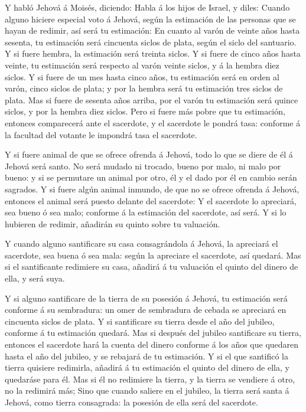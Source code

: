  Y habló Jehová á Moisés, diciendo:  Habla á los
hijos de Israel, y diles: Cuando alguno hiciere especial voto á Jehová,
según la estimación de las personas que se hayan de redimir, así será tu
estimación:  En cuanto al varón de veinte años hasta
sesenta, tu estimación será cincuenta siclos de plata, según el siclo
del santuario.  Y si fuere hembra, la estimación será
treinta siclos.  Y si fuere de cinco años hasta veinte, tu
estimación será respecto al varón veinte siclos, y á la hembra diez
siclos.  Y si fuere de un mes hasta cinco años, tu
estimación será en orden al varón, cinco siclos de plata; y por la
hembra será tu estimación tres siclos de plata.  Mas si
fuere de sesenta años arriba, por el varón tu estimación será quince
siclos, y por la hembra diez siclos.  Pero si fuere más
pobre que tu estimación, entonces comparecerá ante el sacerdote, y el
sacerdote le pondrá tasa: conforme á la facultad del votante le impondrá
tasa el sacerdote.

 Y si fuere animal de que se ofrece ofrenda á Jehová, todo
lo que se diere de él á Jehová será santo.  No será mudado
ni trocado, bueno por malo, ni malo por bueno: y si se permutare un
animal por otro, él y el dado por él en cambio serán sagrados.
 Y si fuere algún animal inmundo, de que no se ofrece
ofrenda á Jehová, entonces el animal será puesto delante del sacerdote:
 Y el sacerdote lo apreciará, sea bueno ó sea malo;
conforme á la estimación del sacerdote, así será.  Y si lo
hubieren de redimir, añadirán su quinto sobre tu valuación.

 Y cuando alguno santificare su casa consagrándola á
Jehová, la apreciará el sacerdote, sea buena ó sea mala: según la
apreciare el sacerdote, así quedará.  Mas si el
santificante redimiere su casa, añadirá á tu valuación el quinto del
dinero de ella, y será suya.

 Y si alguno santificare de la tierra de su posesión á
Jehová, tu estimación será conforme á su sembradura: un omer de
sembradura de cebada se apreciará en cincuenta siclos de plata.
 Y si santificare su tierra desde el año del jubileo,
conforme á tu estimación quedará.  Mas si después del
jubileo santificare su tierra, entonces el sacerdote hará la cuenta del
dinero conforme á los años que quedaren hasta el año del jubileo, y se
rebajará de tu estimación.  Y si el que santificó la tierra
quisiere redimirla, añadirá á tu estimación el quinto del dinero de
ella, y quedaráse para él.  Mas si él no redimiere la
tierra, y la tierra se vendiere á otro, no la redimirá más;
 Sino que cuando saliere en el jubileo, la tierra será
santa á Jehová, como tierra consagrada: la posesión de ella será del
sacerdote.

